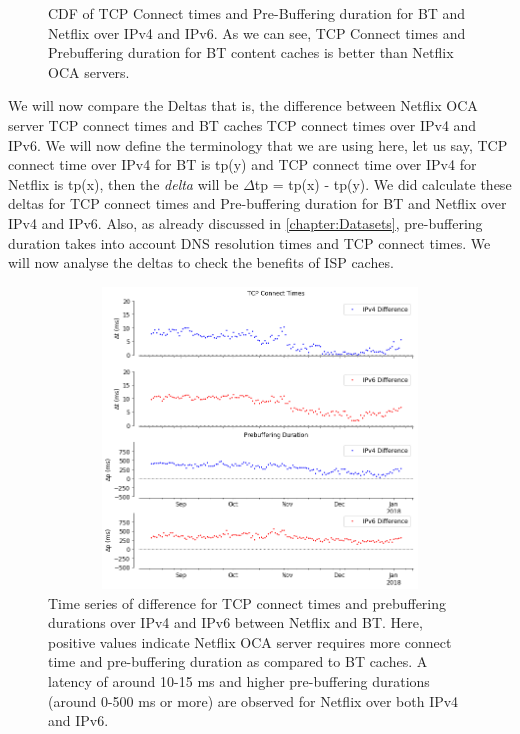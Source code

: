 \begin{figure}
\begin{minipage}{0.5\textwidth}
	\end{minipage}
	\caption[BT-UK Connect Time and Prebuffering Duration CDF Absolute]{CDF of TCP Connect times and Pre-Buffering duration for BT and Netflix over IPv4 and IPv6. As we can see, TCP Connect times and Prebuffering duration for BT content caches is better than Netflix OCA servers.}
	\label{fig:BT-UK Connect Time and Prebuffering Duration CDF Absolute}
\end{figure}

\FloatBarrier

We will now compare the Deltas that is, the difference between Netflix OCA server TCP connect times and BT caches TCP connect times over IPv4 and IPv6. We will now define the
terminology that we are using here, let us say, TCP connect time over IPv4 for BT is tp(y) and TCP connect time over IPv4 for Netflix is tp(x), then the \textit{delta} will be $\Delta$tp = tp(x) - tp(y). 
We did calculate these deltas for TCP connect times and Pre-buffering duration for BT and Netflix over IPv4 and IPv6.
Also, as already discussed in \cref{chapter:Datasets}, pre-buffering duration takes into account DNS resolution times and TCP connect times. 
We will now analyse the deltas to check the benefits of ISP caches.

\begin{figure}[!ht]
	\centering
	\includegraphics[keepaspectratio, height=8cm, width=15cm]{figures/cache/btuk/netflix-tcp-pd-delay-timeseries-asn-2856.png}
	\caption[BT-UK TCP Connect Times and Pre-Buffering Duration Timeseries Deltas]{Time series of difference for TCP connect times and prebuffering durations over IPv4 and IPv6 between Netflix and BT. 
	Here, positive values indicate Netflix OCA server requires more connect time and pre-buffering duration as compared to BT caches. A latency of around 10-15 ms and higher pre-buffering durations (around 0-500 ms or more) are observed for Netflix over both IPv4 and IPv6.}
	\label{fig:BT-UK TCP Connect Times and Pre-Buffering Duration Timeseries Deltas}
\end{figure}

